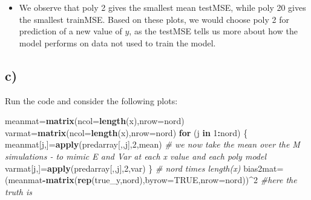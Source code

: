 \documentclass[]{article}
\newenvironment{Shaded}{\begin{snugshade}}{\end{snugshade}}
\newcommand{\KeywordTok}[1]{\textcolor[rgb]{0.13,0.29,0.53}{\textbf{#1}}}
\newcommand{\DataTypeTok}[1]{\textcolor[rgb]{0.13,0.29,0.53}{#1}}
\newcommand{\DecValTok}[1]{\textcolor[rgb]{0.00,0.00,0.81}{#1}}
\newcommand{\CommentTok}[1]{\textcolor[rgb]{0.56,0.35,0.01}{\textit{#1}}}
\newcommand{\OtherTok}[1]{\textcolor[rgb]{0.56,0.35,0.01}{#1}}
\newcommand{\ControlFlowTok}[1]{\textcolor[rgb]{0.13,0.29,0.53}{\textbf{#1}}}
\newcommand{\OperatorTok}[1]{\textcolor[rgb]{0.81,0.36,0.00}{\textbf{#1}}}
\newcommand{\NormalTok}[1]{#1}
\providecommand{\tightlist}{%
  \setlength{\itemsep}{0pt}\setlength{\parskip}{0pt}}
\begin{document}
\begin{itemize}
\tightlist
\item
  We observe that poly 2 gives the smallest mean testMSE, while poly 20
  gives the smallest trainMSE. Based on these plots, we would choose
  poly 2 for prediction of a new value of \(y\), as the testMSE tells us
  more about how the model performs on data not used to train the model.
\end{itemize}

\subsection{c)}\label{c}

Run the code and consider the following plots:

\begin{Shaded}
\begin{Highlighting}[]
\NormalTok{meanmat=}\KeywordTok{matrix}\NormalTok{(}\DataTypeTok{ncol=}\KeywordTok{length}\NormalTok{(x),}\DataTypeTok{nrow=}\NormalTok{nord)}
\NormalTok{varmat=}\KeywordTok{matrix}\NormalTok{(}\DataTypeTok{ncol=}\KeywordTok{length}\NormalTok{(x),}\DataTypeTok{nrow=}\NormalTok{nord)}
\ControlFlowTok{for}\NormalTok{ (j }\ControlFlowTok{in} \DecValTok{1}\OperatorTok{:}\NormalTok{nord)}
\NormalTok{\{}
\NormalTok{  meanmat[j,]=}\KeywordTok{apply}\NormalTok{(predarray[,,j],}\DecValTok{2}\NormalTok{,mean) }\CommentTok{# we now take the mean over the M simulations - to mimic E and Var at each x value and each poly model}
\NormalTok{  varmat[j,]=}\KeywordTok{apply}\NormalTok{(predarray[,,j],}\DecValTok{2}\NormalTok{,var)}
\NormalTok{\}}
\CommentTok{# nord times length(x)}
\NormalTok{bias2mat=(meanmat}\OperatorTok{-}\KeywordTok{matrix}\NormalTok{(}\KeywordTok{rep}\NormalTok{(true_y,nord),}\DataTypeTok{byrow=}\OtherTok{TRUE}\NormalTok{,}\DataTypeTok{nrow=}\NormalTok{nord))}\OperatorTok{^}\DecValTok{2} \CommentTok{#here the truth is}


\end{Highlighting}
\end{Shaded}
\end{document}

